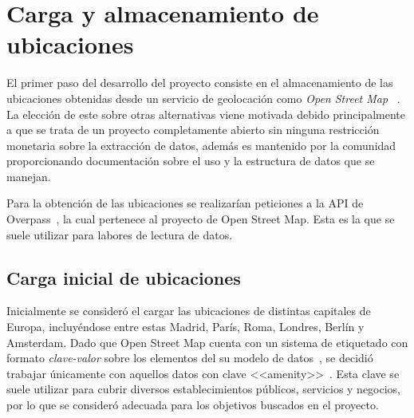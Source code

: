 


\section{Carga y almacenamiento de ubicaciones}

El primer paso del desarrollo del proyecto consiste en el almacenamiento de las ubicaciones obtenidas desde un servicio de geolocación como \textit{Open Street Map} ~\cite{OSM}. La elección de este sobre otras alternativas viene motivada debido principalmente a que se trata de un proyecto completamente abierto sin ninguna restricción monetaria sobre la extracción de datos, además es mantenido por la comunidad proporcionando documentación sobre el uso y la estructura de datos que se manejan.

Para la obtención de las ubicaciones se realizarían peticiones a la API de Overpass~\cite{Overpass}, la cual pertenece al proyecto de Open Street Map. Esta es la que se suele utilizar para labores de lectura de datos.

\subsection{Carga inicial de ubicaciones}

Inicialmente se consideró el cargar las ubicaciones de distintas capitales de Europa, incluyéndose entre estas Madrid, París, Roma, Londres, Berlín y Amsterdam. Dado que Open Street Map cuenta con un sistema de etiquetado con formato \textit{clave-valor} sobre los elementos del su modelo de datos~\cite{OSMtags}, se decidió trabajar únicamente con aquellos datos con clave <<amenity>>~\cite{openstreetmapESKeyamenityOpenStreetMap}. Esta clave se suele utilizar para cubrir diversos establecimientos públicos, servicios y negocios, por lo que se consideró adecuada para los objetivos buscados en el proyecto.

